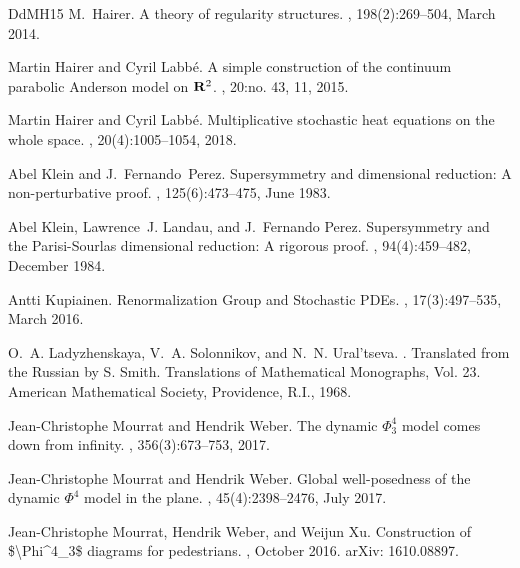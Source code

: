 \documentclass[a4paper,11pt]{article}
\numberwithin{equation}{section}
\newcommand{\8}{\infty}
\begin{document}
\begin{thebibliography}{DdMH15}
M.~Hairer.
\newblock A theory of regularity structures.
, 198(2):269--504, March 2014.

Martin Hairer and Cyril Labb\'e.
\newblock A simple construction of the continuum parabolic {A}nderson model on
  {${\bf R}^2$}.
, 20:no. 43, 11, 2015.

Martin Hairer and Cyril Labb\'e.
\newblock Multiplicative stochastic heat equations on the whole space.
, 20(4):1005--1054, 2018.

Abel Klein and J.~Fernando~Perez.
\newblock Supersymmetry and dimensional reduction: {A} non-perturbative proof.
, 125(6):473--475, June 1983.

Abel Klein, Lawrence~J. Landau, and J.~Fernando Perez.
\newblock Supersymmetry and the {Parisi}-{Sourlas} dimensional reduction: {A}
  rigorous proof.
, 94(4):459--482,
  December 1984.

Antti Kupiainen.
\newblock Renormalization {Group} and {Stochastic} {PDEs}.
, 17(3):497--535, March 2016.

O.~A. Ladyzhenskaya, V.~A. Solonnikov, and N.~N. Ural'tseva.
.
\newblock Translated from the Russian by S. Smith. Translations of Mathematical
  Monographs, Vol. 23. American Mathematical Society, Providence, R.I., 1968.

Jean-Christophe Mourrat and Hendrik Weber.
\newblock The dynamic {$\Phi^4_3$} model comes down from infinity.
, 356(3):673--753, 2017.

Jean-Christophe Mourrat and Hendrik Weber.
\newblock Global well-posedness of the dynamic {$\Phi^4$} model in the plane.
, 45(4):2398--2476, July 2017.

Jean-Christophe Mourrat, Hendrik Weber, and Weijun Xu.
\newblock Construction of \${\textbackslash}{Phi}{\textasciicircum}4\_3\$
  diagrams for pedestrians.
, October 2016.
\newblock arXiv: 1610.08897.


\end{thebibliography}
\end{document}
